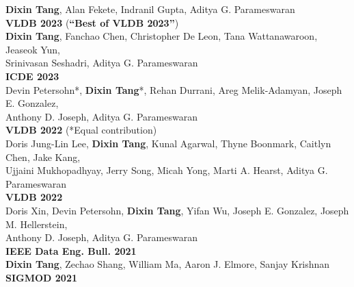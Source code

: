 \documentclass[10pt]{article} %
\begin{document}
{    
    	\> \textbf{Dixin Tang}, Alan Fekete, Indranil Gupta, Aditya G. Parameswaran \\
        \> \textbf{VLDB 2023} (\textbf{“Best of VLDB 2023”}) \\[5mm]
    	
    	\> \textbf{Dixin Tang}, Fanchao Chen, Christopher De Leon, Tana Wattanawaroon, Jeaseok Yun, \\ 
    	\> Srinivasan Seshadri, Aditya G. Parameswaran \\
    	\> \textbf{ICDE 2023} \\[5mm]

    	\> Devin Petersohn*, \textbf{Dixin Tang}*, Rehan Durrani, Areg Melik-Adamyan, Joseph E. Gonzalez, \\
    	\> Anthony D. Joseph, Aditya G. Parameswaran \\
    	\> \textbf{VLDB 2022} (*Equal contribution) \\[5mm]

    	\> Doris Jung-Lin Lee, \textbf{Dixin Tang}, Kunal Agarwal, Thyne Boonmark, Caitlyn Chen, Jake Kang, \\
    	\> Ujjaini Mukhopadhyay, Jerry Song, Micah Yong, Marti A. Hearst, Aditya G. Parameswaran \\
    	\> \textbf{VLDB 2022} \\[5mm]

    	\> Doris Xin, Devin Petersohn, \textbf{Dixin Tang}, Yifan Wu, Joseph E. Gonzalez, Joseph M. Hellerstein,  \\
    	\> Anthony D. Joseph, Aditya G. Parameswaran \\
    	\> \textbf{IEEE Data Eng. Bull. 2021} \\[5mm]

    	\> \textbf{Dixin Tang}, Zechao Shang, William Ma, Aaron J. Elmore, Sanjay Krishnan \\
    	\> \textbf{SIGMOD 2021} \\[5mm]

}
\end{document}
